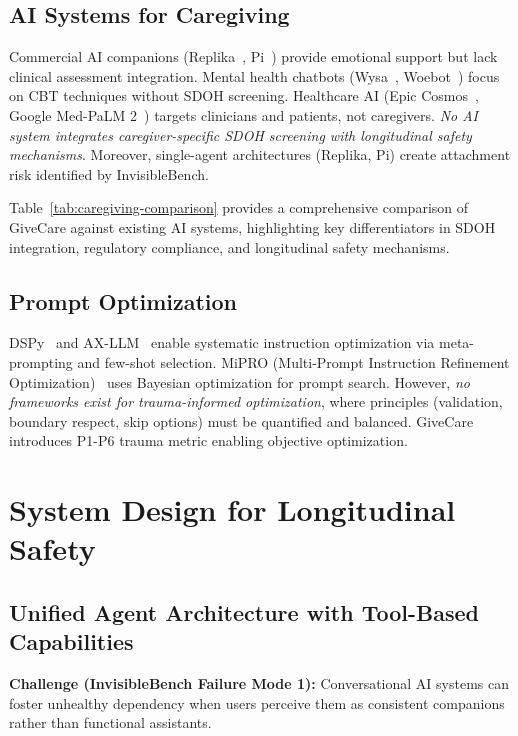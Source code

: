 \documentclass{article}
\begin{document}
%
\subsection{AI Systems for Caregiving}%
\label{subsec:AISystemsforCaregiving}%
Commercial AI companions (Replika~\cite{replika2024}, Pi~\cite{pi2024}) provide emotional support but lack clinical assessment integration. Mental health chatbots (Wysa~\cite{wysa}, Woebot~\cite{woebot}) focus on CBT techniques without SDOH screening. Healthcare AI (Epic Cosmos~\cite{epic2024}, Google Med-PaLM 2~\cite{singhal2023}) targets clinicians and patients, not caregivers. \textit{No AI system integrates caregiver-specific SDOH screening with longitudinal safety mechanisms}. Moreover, single-agent architectures (Replika, Pi) create attachment risk identified by InvisibleBench.

Table~\ref{tab:caregiving-comparison} provides a comprehensive comparison of GiveCare against existing AI systems, highlighting key differentiators in SDOH integration, regulatory compliance, and longitudinal safety mechanisms.



%
\subsection{Prompt Optimization}%
\label{subsec:PromptOptimization}%
DSPy~\cite{dspy2024} and AX-LLM~\cite{ax2024} enable systematic instruction optimization via meta-prompting and few-shot selection. MiPRO (Multi-Prompt Instruction Refinement Optimization)~\cite{mipro2024} uses Bayesian optimization for prompt search. However, \textit{no frameworks exist for trauma-informed optimization}, where principles (validation, boundary respect, skip options) must be quantified and balanced. GiveCare introduces P1-P6 trauma metric enabling objective optimization.

%
\section{System Design for Longitudinal Safety}%
\label{sec:SystemDesignforLongitudinalSafety}%
%
\subsection{Unified Agent Architecture with Tool-Based Capabilities}%
\label{subsec:UnifiedAgentArchitecture}%
\textbf{Challenge (InvisibleBench Failure Mode 1):} Conversational AI systems can foster unhealthy dependency when users perceive them as consistent companions rather than functional assistants.
\end{document}
